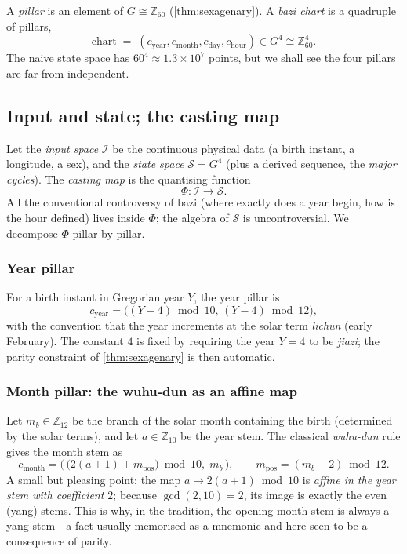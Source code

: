 \documentclass[11pt,a4paper]{article}
\theoremstyle{definition}
\theoremstyle{remark}
\newcommand{\Z}{\mathbb{Z}}
\begin{document}
A \emph{pillar} is an element of $G\cong\Z_{60}$ (\cref{thm:sexagenary}). A \emph{bazi chart} is a quadruple of pillars,
\[
\mathrm{chart}\;=\;(c_{\text{year}},c_{\text{month}},c_{\text{day}},c_{\text{hour}})\in G^4\cong\Z_{60}^4.
\]
The naive state space has $60^4\approx 1.3\times10^7$ points, but we shall see the four pillars are far from independent.

\subsection{Input and state; the casting map}
Let the \emph{input space} $\mathcal{I}$ be the continuous physical data (a birth instant, a longitude, a sex), and the \emph{state space} $\mathcal{S}=G^4$ (plus a derived sequence, the \emph{major cycles}). The \emph{casting map} is the quantising function
\[
\Phi:\mathcal{I}\longrightarrow\mathcal{S}.
\]
All the conventional controversy of bazi (where exactly does a year begin, how is the hour defined) lives inside $\Phi$; the algebra of $\mathcal{S}$ is uncontroversial. We decompose $\Phi$ pillar by pillar.

\subsubsection{Year pillar}
For a birth instant in Gregorian year $Y$, the year pillar is
\[
c_{\text{year}}=\big((Y-4)\bmod 10,\,(Y-4)\bmod 12\big),
\]
with the convention that the year increments at the solar term \emph{lichun} (early February). The constant $4$ is fixed by requiring the year $Y=4$ to be \emph{jiazi}; the parity constraint of \cref{thm:sexagenary} is then automatic.

\subsubsection{Month pillar: the wuhu-dun as an affine map}
Let $m_b\in\Z_{12}$ be the branch of the solar month containing the birth (determined by the solar terms), and let $a\in\Z_{10}$ be the year stem. The classical \emph{wuhu-dun} rule gives the month stem as
\[
c_{\text{month}}=\big(\,\big(2(a+1)+m_{\text{pos}}\big)\bmod 10,\;m_b\,\big),\qquad m_{\text{pos}}=(m_b-2)\bmod 12.
\]
A small but pleasing point: the map $a\mapsto 2(a+1)\bmod 10$ is \emph{affine in the year stem with coefficient $2$}; because $\gcd(2,10)=2$, its image is exactly the even (yang) stems. This is why, in the tradition, the opening month stem is always a yang stem---a fact usually memorised as a mnemonic and here seen to be a consequence of parity.
\end{document}
